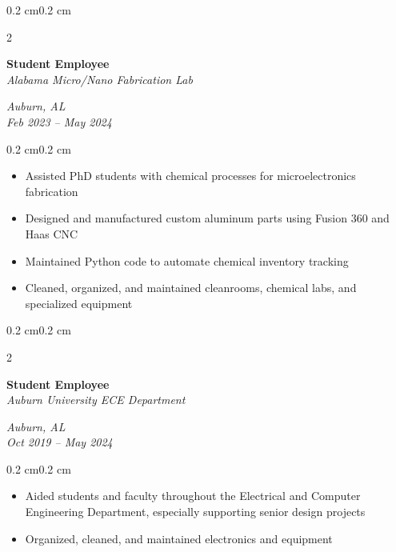 \documentclass[10pt, letterpaper]{article}
\newenvironment{highlights}{
    \begin{itemize}[topsep=0.10 cm,parsep=0.10 cm,partopsep=0pt,itemsep=0pt,leftmargin=0.4 cm + 10pt]
}{
    \end{itemize}
}
\newenvironment{onecolentry}{
    \begin{adjustwidth}{0.2 cm}{0.2 cm}
}{
    \end{adjustwidth}
}
\newenvironment{twocolentry}[2][]{
    \onecolentry
    \def\secondColumn{#2}
    \setcolumnwidth{\fill, 4.5 cm}
    \begin{paracol}{2}
}{
    \switchcolumn \raggedleft \secondColumn
    \end{paracol}
    \endonecolentry
}
\begin{document}
        \vspace{0.2 cm}

        \begin{twocolentry}{\textit{Auburn, AL} \\ \textit{Feb 2023 – May 2024}}
            \textbf{Student Employee} \\
            \textit{Alabama Micro/Nano Fabrication Lab}
        \end{twocolentry}
        \vspace{0.10 cm}
        \begin{onecolentry}
            \begin{highlights}
                \item Assisted PhD students with chemical processes for microelectronics fabrication
                \item Designed and manufactured custom aluminum parts using Fusion 360 and Haas CNC
                \item Maintained Python code to automate chemical inventory tracking
                \item Cleaned, organized, and maintained cleanrooms, chemical labs, and specialized equipment
            \end{highlights}
        \end{onecolentry}

        \vspace{0.2 cm}

        \begin{twocolentry}{\textit{Auburn, AL} \\ \textit{Oct 2019 – May 2024}}
            \textbf{Student Employee} \\
            \textit{Auburn University ECE Department}
        \end{twocolentry}
        \vspace{0.10 cm}
        \begin{onecolentry}
            \begin{highlights}
                \item Aided students and faculty throughout the Electrical and Computer Engineering Department, especially supporting senior design projects
                \item Organized, cleaned, and maintained electronics and equipment
            \end{highlights}
        \end{onecolentry}

        \vspace{0.2 cm}
\end{document}
